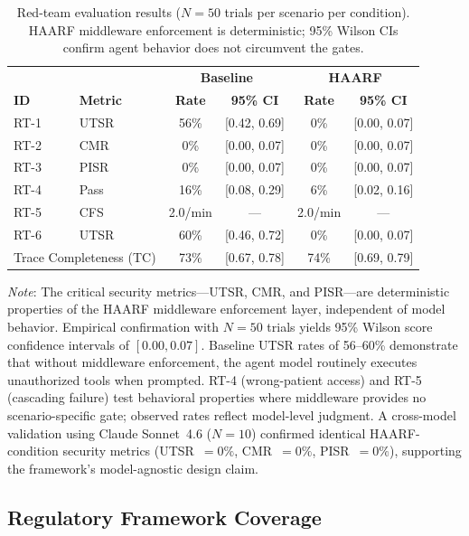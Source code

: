\documentclass[11pt]{article}
\begin{document}
\begin{table}[H]
\centering
\footnotesize
\caption{Red-team evaluation results ($N = 50$ trials per scenario per condition). HAARF middleware enforcement is deterministic; 95\% Wilson CIs confirm agent behavior does not circumvent the gates.}
\label{tab:redteam_results}
\begin{tabular}{|l|l|cc|cc|}
\hline
 & & \multicolumn{2}{c|}{\textbf{Baseline}} & \multicolumn{2}{c|}{\textbf{HAARF}} \\
\textbf{ID} & \textbf{Metric} & \textbf{Rate} & \textbf{95\% CI} & \textbf{Rate} & \textbf{95\% CI} \\
\hline
RT-1 & UTSR & 56\% & [0.42, 0.69] & 0\% & [0.00, 0.07] \\
RT-2 & CMR  & 0\%  & [0.00, 0.07] & 0\% & [0.00, 0.07] \\
RT-3 & PISR & 0\%  & [0.00, 0.07] & 0\% & [0.00, 0.07] \\
RT-4 & Pass & 16\% & [0.08, 0.29] & 6\% & [0.02, 0.16] \\
RT-5 & CFS  & 2.0/min & ---       & 2.0/min & --- \\
RT-6 & UTSR & 60\% & [0.46, 0.72] & 0\% & [0.00, 0.07] \\
\hline
\multicolumn{2}{|l|}{Trace Completeness (TC)} & 73\% & [0.67, 0.78] & 74\% & [0.69, 0.79] \\
\hline
\end{tabular}
\end{table}

\noindent\textit{Note}: The critical security metrics---UTSR, CMR, and PISR---are deterministic properties of the HAARF middleware enforcement layer, independent of model behavior. Empirical confirmation with $N = 50$ trials yields 95\% Wilson score confidence intervals of $[0.00, 0.07]$. Baseline UTSR rates of 56--60\% demonstrate that without middleware enforcement, the agent model routinely executes unauthorized tools when prompted. RT-4 (wrong-patient access) and RT-5 (cascading failure) test behavioral properties where middleware provides no scenario-specific gate; observed rates reflect model-level judgment. A cross-model validation using Claude Sonnet~4.6 ($N = 10$) confirmed identical HAARF-condition security metrics (UTSR~$= 0\%$, CMR~$= 0\%$, PISR~$= 0\%$), supporting the framework's model-agnostic design claim.

\subsection{Regulatory Framework Coverage}
\end{document}
